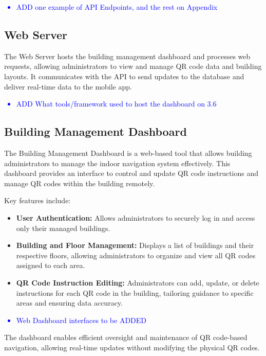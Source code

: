 \textcolor{blue}{
	\begin{itemize}
		\item ADD one example of API Endpoints, and the rest on Appendix 
\end{itemize}}

\subsection{Web Server}

The Web Server hosts the building management dashboard and processes web requests, allowing administrators to view and manage QR code data and building layouts. It communicates with the API to send updates to the database and deliver real-time data to the mobile app. 

\textcolor{blue}{
	\begin{itemize}
		\item ADD What tools/framework used to host the dashboard on 3.6
\end{itemize}}

\subsection{Building Management Dashboard}

The Building Management Dashboard is a web-based tool that allows building administrators to manage the indoor navigation system effectively. This dashboard provides an interface to control and update QR code instructions and manage QR codes within the building remotely.

Key features include:
\begin{itemize}
	\item \textbf{User Authentication:} Allows administrators to securely log in and access only their managed buildings.
	\item \textbf{Building and Floor Management:} Displays a list of buildings and their respective floors, allowing administrators to organize and view all QR codes assigned to each area.
	\item \textbf{QR Code Instruction Editing:} Administrators can add, update, or delete instructions for each QR code in the building, tailoring guidance to specific areas and ensuring data accuracy.
\end{itemize}

\textcolor{blue}{
	\begin{itemize}
		\item Web Dashboard interfaces to be ADDED
\end{itemize}}

The dashboard enables efficient oversight and maintenance of QR code-based navigation, allowing real-time updates without modifying the physical QR codes.
